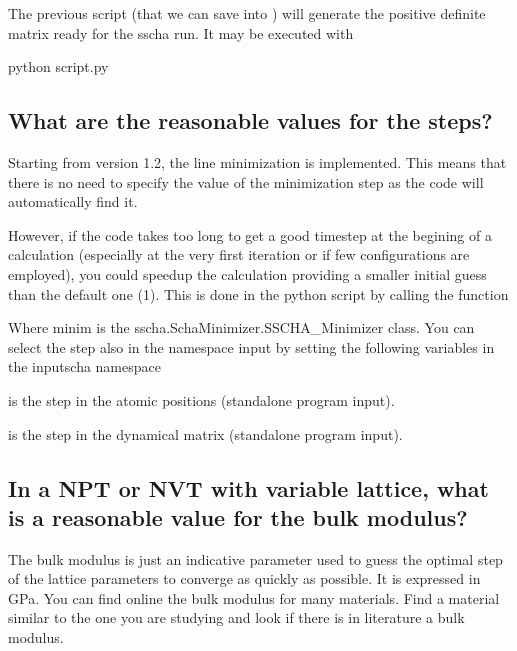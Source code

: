 \documentclass[a4paper,11pt,english]{sphinxmanual}
\begin{document}
\sphinxAtStartPar
The previous script (that we can save into ) will generate the positive definite matrix ready for the sscha run. It may be executed with

\begin{sphinxVerbatim}[commandchars=\\\{\}]
python script.py
\end{sphinxVerbatim}


\subsection{What are the reasonable values for the steps?}
\label{\detokenize{faq:what-are-the-reasonable-values-for-the-steps}}
\sphinxAtStartPar
Starting from version 1.2, the line minimization is implemented. This means that there is no need to specify the value of the minimization step as the code will automatically find it.

\sphinxAtStartPar
However, if the code takes too long to get a good timestep at the begining of a calculation (especially at the very first iteration or if few configurations are employed), you could speedup the calculation providing a smaller initial guess than the default one (1).
This is done in the python script by calling the function

\begin{sphinxVerbatim}[commandchars=\\\{\}]
\end{sphinxVerbatim}

\sphinxAtStartPar
Where minim is the sscha.SchaMinimizer.SSCHA\_Minimizer class. You can select the step also in the namespace input by setting the following variables in the inputscha namespace

\sphinxAtStartPar
{} is the step in the atomic positions (stand\sphinxhyphen{}alone program input).

\sphinxAtStartPar
{} is the step in the dynamical matrix (stand\sphinxhyphen{}alone program input).


\subsection{In a NPT or NVT with variable lattice, what is a reasonable value for the bulk modulus?}
\label{\detokenize{faq:in-a-npt-or-nvt-with-variable-lattice-what-is-a-reasonable-value-for-the-bulk-modulus}}
\sphinxAtStartPar
The bulk modulus is just an indicative parameter used to guess the optimal step of the lattice parameters to converge as quickly as possible.
It is expressed in GPa. You can find online the bulk modulus for many materials. Find a material similar to the one you are studying and look if there is in literature a bulk modulus.
\end{document}
